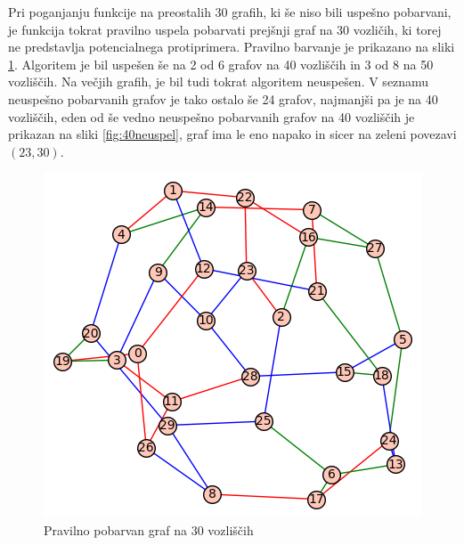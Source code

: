 \documentclass[12pt, a4paper]{article}
\begin{document}
Pri poganjanju funkcije na preostalih 30 grafih, ki še niso bili uspešno pobarvani, je funkcija tokrat pravilno uspela pobarvati prejšnji graf na 30 vozličih, ki torej ne predstavlja potencialnega protiprimera. Pravilno barvanje je prikazano na sliki \ref{fig:30uspesno}. Algoritem je bil uspešen še na 2 od 6 grafov na 40 vozliščih in 3 od 8 na 50 vozliščih. Na večjih grafih, je bil tudi tokrat algoritem neuspešen. V seznamu neuspešno pobarvanih grafov je tako ostalo še 24 grafov, najmanjši pa je na 40 vozliščih, eden od še vedno neuspešno pobarvanih grafov na 40 vozliščih je prikazan na sliki \ref{fig:40neuspel}, graf ima le eno napako in sicer na zeleni povezavi $(23, 30)$.

\begin{figure}[H]
  \includegraphics[width=\linewidth]{30uspel_pobarvan}
  \caption{Pravilno pobarvan graf na 30 vozliščih}
  \label{fig:30uspesno}
\end{figure}
\end{document}
